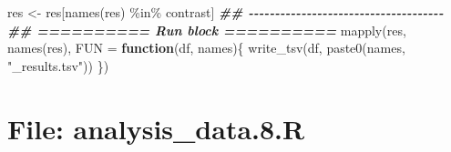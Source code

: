 \documentclass[
]{article}
\newenvironment{Shaded}{\begin{snugshade}}{\end{snugshade}}
\newcommand{\AttributeTok}[1]{\textcolor[rgb]{0.77,0.63,0.00}{#1}}
\newcommand{\ControlFlowTok}[1]{\textcolor[rgb]{0.13,0.29,0.53}{\textbf{#1}}}
\newcommand{\DocumentationTok}[1]{\textcolor[rgb]{0.56,0.35,0.01}{\textbf{\textit{#1}}}}
\newcommand{\FunctionTok}[1]{\textcolor[rgb]{0.00,0.00,0.00}{#1}}
\newcommand{\NormalTok}[1]{#1}
\newcommand{\OtherTok}[1]{\textcolor[rgb]{0.56,0.35,0.01}{#1}}
\newcommand{\SpecialCharTok}[1]{\textcolor[rgb]{0.00,0.00,0.00}{#1}}
\newcommand{\StringTok}[1]{\textcolor[rgb]{0.31,0.60,0.02}{#1}}
\begin{document}
\begin{Shaded}
\begin{Highlighting}[]
\NormalTok{res }\OtherTok{\textless{}{-}}\NormalTok{ res[}\FunctionTok{names}\NormalTok{(res) }\SpecialCharTok{\%in\%}\NormalTok{ contrast]}
\DocumentationTok{\#\# {-}{-}{-}{-}{-}{-}{-}{-}{-}{-}{-}{-}{-}{-}{-}{-}{-}{-}{-}{-}{-}{-}{-}{-}{-}{-}{-}{-}{-}{-}{-}{-}{-}{-}{-}{-}{-} }
\DocumentationTok{\#\# ========== Run block ========== }
\FunctionTok{mapply}\NormalTok{(res, }\FunctionTok{names}\NormalTok{(res), }
       \AttributeTok{FUN =} \ControlFlowTok{function}\NormalTok{(df, names)\{}
         \FunctionTok{write\_tsv}\NormalTok{(df, }\FunctionTok{paste0}\NormalTok{(names, }\StringTok{"\_results.tsv"}\NormalTok{))}
\NormalTok{              \})}
\end{Highlighting}
\end{Shaded}

\hypertarget{file-analysis_data.8.r}{%
\section{File: analysis\_data.8.R}\label{file-analysis_data.8.r}}
\end{document}
